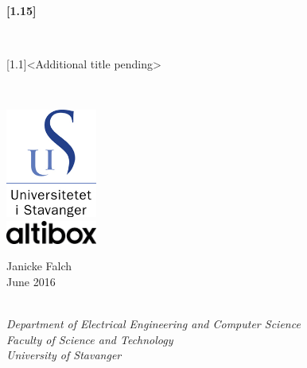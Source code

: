 \thispagestyle{empty}
\vspace*{2cm}
\begin{center}
    \scshape{
        \begin{Huge}\textbf{\scalebox{1}[1.15]{\toolname}}\end{Huge}\\
        \vspace{0.6cm}
        \begin{Large}\scalebox{1}[1.1]{<Additional title pending>}\end{Large}\\
    }
    \vspace{2.6cm}
    \includegraphics[width=3cm]{figures/uis_logo}\\
    \vspace{0.8cm}
    \includegraphics[width=3cm]{figures/logo_pos_RGB}\\
    \vspace{1.6cm}
    \begin{large}Janicke Falch\\
    \vspace{0.2cm}
    June 2016\end{large}\\
    \vspace{1cm}
    \emph{
        Department of Electrical Engineering and Computer Science\\
        Faculty of Science and Technology\\
        University of Stavanger
    }
\end{center}